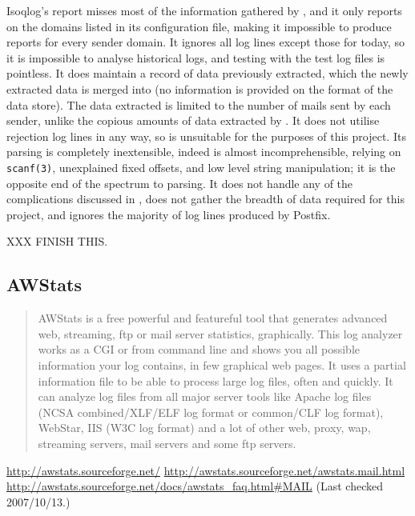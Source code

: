 Isoqlog's report misses most of the information gathered by \parsername{},
and it only reports on the domains listed in its configuration file, making
it impossible to produce reports for every sender domain.  It ignores all
log lines except those for today, so it is impossible to analyse historical
logs, and testing with the \numberOFlogFILES{} test log files is pointless.
It does maintain a record of data previously extracted, which the newly
extracted data is merged into (no information is provided on the format of
the data store).  The data extracted is limited to the number of mails sent
by each sender, unlike the copious amounts of data extracted by
\parsername{}.  It does not utilise rejection log lines in any way, so is
unsuitable for the purposes of this project.  Its parsing is completely
inextensible, indeed is almost incomprehensible, relying on
\texttt{scanf(3)}, unexplained fixed offsets, and low level string
manipulation; it is the opposite end of the spectrum to \parsernames{}
parsing.  It does not handle any of the complications discussed in
, does not gather the breadth of data required
for this project, and ignores the majority of log lines produced by
Postfix.

XXX FINISH THIS\@.

\subsection{AWStats}

\begin{quotation}

    AWStats is a free powerful and featureful tool that generates advanced
    web, streaming, ftp or mail server statistics, graphically. This log
    analyzer works as a CGI or from command line and shows you all possible
    information your log contains, in few graphical web pages. It uses a
    partial information file to be able to process large log files, often
    and quickly. It can analyze log files from all major server tools like
    Apache log files (NCSA combined/XLF/ELF log format or common/CLF log
    format), WebStar, IIS (W3C log format) and a lot of other web, proxy,
    wap, streaming servers, mail servers and some ftp servers.

\end{quotation}

\noindent{}\url{http://awstats.sourceforge.net/} \newline{}
\url{http://awstats.sourceforge.net/awstats.mail.html} \newline{}
\url{http://awstats.sourceforge.net/docs/awstats_faq.html#MAIL} \newline{}
(Last checked 2007/10/13.)

